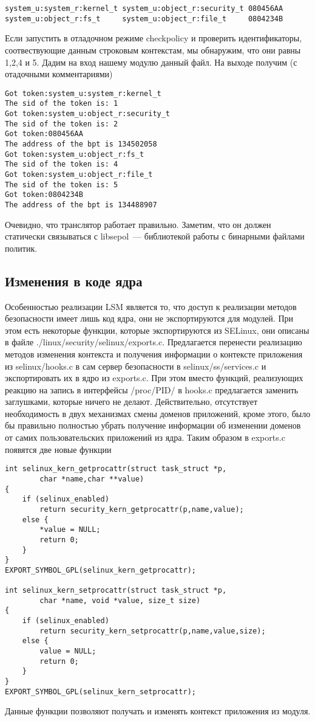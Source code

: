 \bigskip
\begin{lstlisting}
system_u:system_r:kernel_t system_u:object_r:security_t 080456AA
system_u:object_r:fs_t     system_u:object_r:file_t     0804234B
\end{lstlisting}

\bigskip
Если запустить в отладочном режиме 
checkpolicy и проверить идентификаторы,
соотвествующие данным строковым контекстам, 
мы обнаружим, что они равны 1,2,4 и 5. Дадим 
на вход нашему модулю данный файл. На выходе 
получим (с отадочными комментариями)

\begin{lstlisting}
Got token:system_u:system_r:kernel_t
The sid of the token is: 1
Got token:system_u:object_r:security_t
The sid of the token is: 2
Got token:080456AA
The address of the bpt is 134502058
Got token:system_u:object_r:fs_t
The sid of the token is: 4
Got token:system_u:object_r:file_t
The sid of the token is: 5
Got token:0804234B
The address of the bpt is 134488907
\end{lstlisting}

\bigskip
Очевидно, что транслятор работает 
правильно. Заметим, что он должен статически
связываться с libsepol~--- библиотекой 
работы с бинарными файлами политик. 

\bigskip
\subsection{Изменения в коде ядра}
Особенностью реализации LSM является то, 
что доступ к реализации методов безопасности 
имеет лишь код ядра, они не экспортируются для 
модулей. При этом есть некоторые функции, 
которые экспортируются из SELinux, они описаны 
в файле ./linux/security/selinux/exports.c. 
Предлагается перенести реализацию методов
изменения контекста и получения информации 
о контексте приложения из selinux/hooks.c в 
сам сервер безопасности в selinux/ss/services.c
и экспортировать их в ядро из exports.c. При этом
вместо функций, реализующих реакцию на запись 
в интерфейсы /proc/PID/ в hooks.c предлагается 
заменить заглушками, которые ничего не делают. 
Действительно, отсутствует необходимость в 
двух механизмах смены доменов приложений, 
кроме этого, было бы правильно полностью 
убрать получение информации об изменении 
доменов от самих пользовательских приложений
из ядра. Таким образом в exports.c появятся две 
новые функции 

\bigskip 
\begin{lstlisting}
int selinux_kern_getprocattr(struct task_struct *p,
		char *name,char **value)
{
	if (selinux_enabled)
		return security_kern_getprocattr(p,name,value);
	else {
		*value = NULL;
		return 0;
	}
}
EXPORT_SYMBOL_GPL(selinux_kern_getprocattr);

int selinux_kern_setprocattr(struct task_struct *p, 
		char *name, void *value, size_t size)
{
	if (selinux_enabled)
		return security_kern_setprocattr(p,name,value,size);
	else {
		value = NULL;
		return 0;
	}
}
EXPORT_SYMBOL_GPL(selinux_kern_setprocattr);
\end{lstlisting} 

\bigskip 
Данные функции позволяют получать и 
изменять контекст приложения из модуля. 
